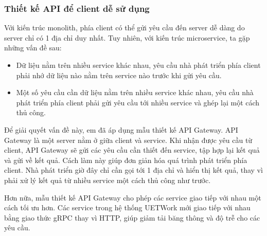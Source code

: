 \documentclass[./../main.tex]{subfiles}
\begin{document}
\hypertarget{thiux1ebft-kux1ebf-api-ux111ux1ec3-client-dux1ec5-sux1eed-dux1ee5ng}{%
\subsubsection{Thiết kế API để client dễ sử
dụng}\label{thiux1ebft-kux1ebf-api-ux111ux1ec3-client-dux1ec5-sux1eed-dux1ee5ng}}

Với kiến trúc monolith, phía client có thể gửi yêu cầu đến server dễ
dàng do server chỉ có 1 địa chỉ duy nhất. Tuy nhiên, với kiến trúc
microservice, ta gặp những vấn đề sau:

\begin{itemize}
\item
  
  Dữ liệu nằm trên nhiều service khác nhau, yêu cầu nhà phát triển phía
  client phải nhớ dữ liệu nào nằm trên service nào trước khi gửi yêu
  cầu.
  
\item
  
  Một số yêu cầu cần dữ liệu nằm trên nhiều service khác nhau, yêu cầu
  nhà phát triển phía client phải gửi yêu cầu tới nhiều service và ghép
  lại một cách thủ công.
  
\end{itemize}

Để giải quyết vấn đề này, em đã áp dụng mẫu thiết kế API Gateway. API
Gateway là một server nằm ở giữa client và service. Khi nhận được yêu
cầu từ client, API Gateway sẽ gửi các yêu cầu cần thiết đến service, tập
hợp lại kết quả và gửi về kết quả. Cách làm này giúp đơn giản hóa quá
trình phát triển phía client. Nhà phát triển giờ đây chỉ cần gọi tới 1
địa chỉ và hiển thị kết quả, thay vì phải xử lý kết quả từ nhiều service
một cách thủ công như trước.

Hơn nữa, mẫu thiết kế API Gateway cho phép các service giao tiếp với
nhau một cách tối ưu hơn. Các service trong hệ thống UETWork mới giao
tiếp với nhau bằng giao thức gRPC\cite{Goo22} thay vì HTTP, giúp giảm tải băng thông
và độ trễ cho các yêu cầu.
\end{document}
